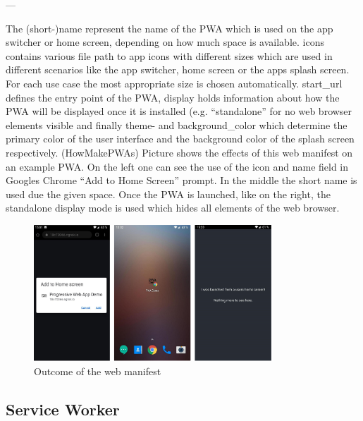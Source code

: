---

The (short-)name represent the name of the PWA which is used on the app switcher or home screen, depending on how much space is available. icons contains various file path to app icons with different sizes which are used in different scenarios like the app switcher, home screen or the apps splash screen. For each use case the most appropriate size is chosen automatically. start\_url defines the entry point of the PWA, display holds information about how the PWA will be displayed once it is installed (e.g. “standalone” for no web browser elements visible and finally theme- and background\_color which determine the primary color of the user interface and the background color of the splash screen respectively. (HowMakePWAs)
\newline
Picture shows the effects of this web manifest on an example PWA. On the left one can see the use of the icon and name field in Googles Chrome “Add to Home Screen” prompt. In the middle the short name is used due the given space. Once the PWA is launched, like on the right, the standalone display mode is used which hides all elements of the web browser. 

\begin{figure}[htbp] 
	\centering
	\includegraphics[width=0.8\textwidth]{Assets/chapter_pwa/manifest_demo.png}
	\caption{Outcome of the web manifest}
	\label{fig:pwa_webmanifest}
\end{figure}

\subsection{Service Worker}
\label{sec:theorieCc}

